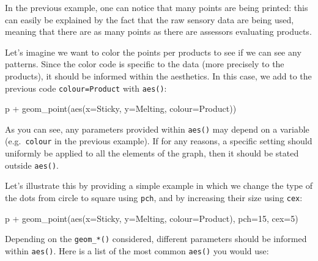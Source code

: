 \documentclass[
]{book}
\newenvironment{Shaded}{\begin{snugshade}}{\end{snugshade}}
\newcommand{\AttributeTok}[1]{\textcolor[rgb]{0.77,0.63,0.00}{#1}}
\newcommand{\DecValTok}[1]{\textcolor[rgb]{0.00,0.00,0.81}{#1}}
\newcommand{\FunctionTok}[1]{\textcolor[rgb]{0.00,0.00,0.00}{#1}}
\newcommand{\NormalTok}[1]{#1}
\newcommand{\SpecialCharTok}[1]{\textcolor[rgb]{0.00,0.00,0.00}{#1}}
\begin{document}
In the previous example, one can notice that many points are being printed: this can easily be explained by the fact that the raw sensory data are being used, meaning that there are as many points as there are assessors evaluating products.

Let's imagine we want to color the points per products to see if we can see any patterns. Since the color code is specific to the data (more precisely to the products), it should be informed within the aesthetics. In this case, we add to the previous code \texttt{colour=Product} with \texttt{aes()}:

\begin{Shaded}
\begin{Highlighting}[]
\NormalTok{p }\SpecialCharTok{+} \FunctionTok{geom\_point}\NormalTok{(}\FunctionTok{aes}\NormalTok{(}\AttributeTok{x=}\NormalTok{Sticky, }\AttributeTok{y=}\NormalTok{Melting, }\AttributeTok{colour=}\NormalTok{Product))}
\end{Highlighting}
\end{Shaded}

As you can see, any parameters provided within \texttt{aes()} may depend on a variable (e.g.~\texttt{colour} in the previous example).
If for any reasons, a specific setting should uniformly be applied to all the elements of the graph, then it should be stated outside \texttt{aes()}.

Let's illustrate this by providing a simple example in which we change the type of the dots from circle to square using \texttt{pch}, and by increasing their size using \texttt{cex}:

\begin{Shaded}
\begin{Highlighting}[]
\NormalTok{p }\SpecialCharTok{+} \FunctionTok{geom\_point}\NormalTok{(}\FunctionTok{aes}\NormalTok{(}\AttributeTok{x=}\NormalTok{Sticky, }\AttributeTok{y=}\NormalTok{Melting, }\AttributeTok{colour=}\NormalTok{Product), }\AttributeTok{pch=}\DecValTok{15}\NormalTok{, }\AttributeTok{cex=}\DecValTok{5}\NormalTok{)}
\end{Highlighting}
\end{Shaded}

Depending on the \texttt{geom\_*()} considered, different parameters should be informed within \texttt{aes()}. Here is a list of the most common \texttt{aes()} you would use:
\end{document}
